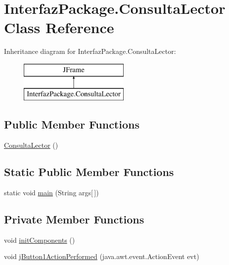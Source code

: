 \hypertarget{class_interfaz_package_1_1_consulta_lector}{}\section{Interfaz\+Package.\+Consulta\+Lector Class Reference}
\label{class_interfaz_package_1_1_consulta_lector}
Inheritance diagram for Interfaz\+Package.\+Consulta\+Lector\+:\begin{figure}[H]
\begin{center}
\leavevmode
\includegraphics[height=2.000000cm]{class_interfaz_package_1_1_consulta_lector}
\end{center}
\end{figure}
\subsection*{Public Member Functions}
\begin{DoxyCompactItemize}
\item 
\mbox{\hyperlink{class_interfaz_package_1_1_consulta_lector_aada092751d0db60c4a1b6fcde682d30b}{Consulta\+Lector}} ()
\end{DoxyCompactItemize}
\subsection*{Static Public Member Functions}
\begin{DoxyCompactItemize}
\item 
static void \mbox{\hyperlink{class_interfaz_package_1_1_consulta_lector_a0880f06bffeb16717c3f6af391316bb4}{main}} (String args\mbox{[}$\,$\mbox{]})
\end{DoxyCompactItemize}
\subsection*{Private Member Functions}
\begin{DoxyCompactItemize}
\item 
void \mbox{\hyperlink{class_interfaz_package_1_1_consulta_lector_a44ed42879c7267fed30baff36bedb921}{init\+Components}} ()
\item 
void \mbox{\hyperlink{class_interfaz_package_1_1_consulta_lector_a61728802e88ad23c202f7ede6783b30c}{j\+Button1\+Action\+Performed}} (java.\+awt.\+event.\+Action\+Event evt)
\end{DoxyCompactItemize}
